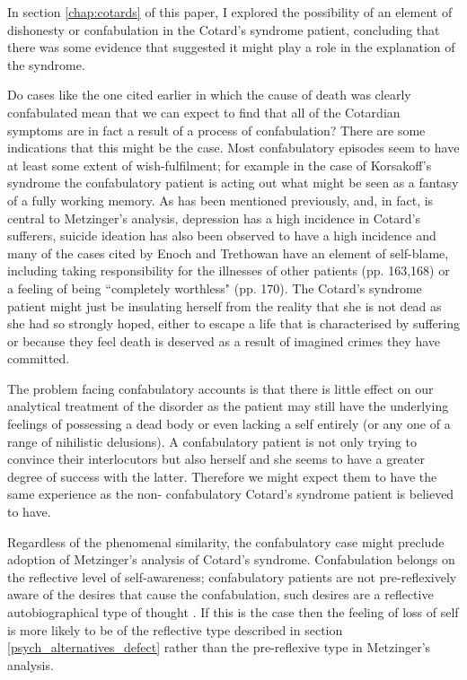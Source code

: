 In section \ref{chap:cotards} of this paper, I explored the possibility of an element of dishonesty or confabulation in the Cotard's syndrome patient, concluding that there was some evidence that suggested it might play a role in the explanation of the syndrome.

Do cases like the one cited earlier in which the cause of death was clearly confabulated mean that we can expect to find that all of the Cotardian symptoms are in fact a result of a process of confabulation? There are some indications that this might be the case. Most confabulatory episodes seem to have at least some extent of wish-fulfilment; for example in the case of Korsakoff's syndrome the confabulatory patient is acting out what might be seen as a fantasy of a fully working memory. As has been mentioned previously, and, in fact, is central to Metzinger's analysis, depression has a high incidence in Cotard's sufferers, suicide ideation has also been observed to have a high incidence and many of the cases cited by Enoch and Trethowan \cite{enoch1991} have an element of self-blame, including taking responsibility for the illnesses of other patients (pp. 163,168) or a feeling of being ``completely worthless" (pp. 170). The Cotard's syndrome patient might just be insulating herself from the reality that she is not dead as she had so strongly hoped, either to escape a life that is characterised by suffering or because they feel death is deserved as a result of imagined crimes they have committed.

The problem facing confabulatory accounts is that there is little effect on our analytical treatment of the disorder as the patient may still have the underlying feelings of possessing a dead body or even lacking a self entirely (or any one of a range of nihilistic delusions). A confabulatory patient is not only trying to convince their interlocutors but also herself and she seems to have a greater degree of success with the latter. Therefore we might expect them to have the same experience as the non- confabulatory Cotard's syndrome patient is believed to have.

Regardless of the phenomenal similarity, the confabulatory case might preclude adoption of Metzinger's analysis of Cotard's syndrome. Confabulation belongs on the reflective level of self-awareness; confabulatory patients are not pre-reflexively aware of the desires that cause the confabulation, such desires are a reflective autobiographical type of thought \cite[p. 313]{metzinger2003}. If this is the case then the feeling of loss of self is more likely to be of the reflective type described in section \ref{psych_alternatives_defect} rather than the pre-reflexive type in Metzinger's analysis.

